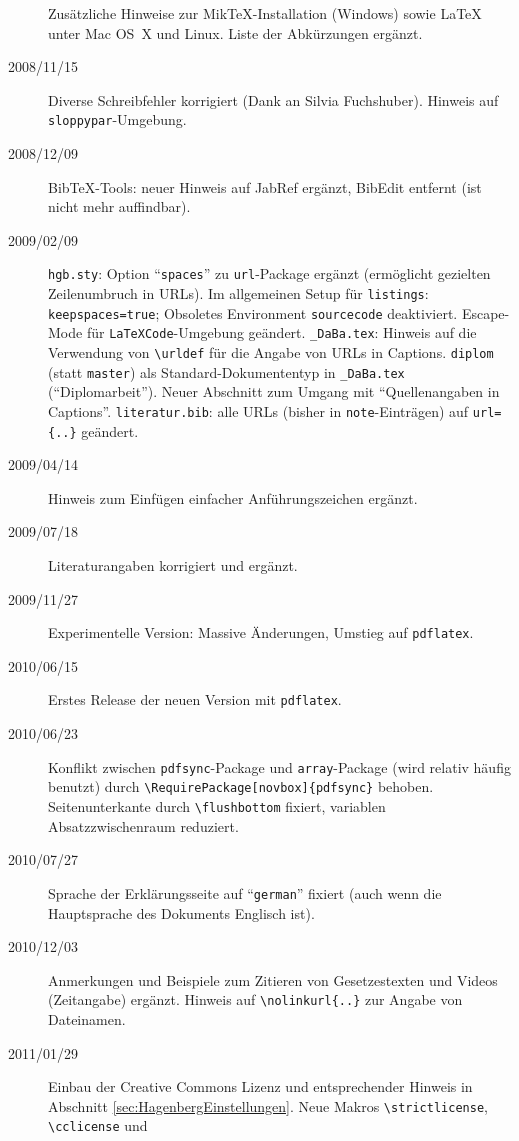 \begin{sloppypar}
\begin{description}
Zusätzliche Hinweise zur MikTeX-Installation (Windows) sowie LaTeX unter Mac OS~X und Linux.
Liste der Abkürzungen ergänzt.%
\item[2008/11/15] 
Diverse Schreibfehler korrigiert (Dank an Silvia Fuchshuber). Hinweis auf 
\texttt{sloppypar}-Umgebung.
%
\item[2008/12/09] 
BibTeX-Tools: neuer Hinweis auf JabRef ergänzt, BibEdit entfernt (ist nicht mehr auffindbar).
%
\item[2009/02/09]
\texttt{hgb.sty}: Option "`\texttt{spaces}"' zu \texttt{url}-Package ergänzt (ermöglicht gezielten Zeilenumbruch in URLs). 
Im allgemeinen Setup für \texttt{listings}: \texttt{keepspaces=true};
Obsoletes Environment \texttt{sourcecode} deaktiviert.
Escape-Mode für \texttt{LaTeXCode}-Umgebung geändert.
\verb!_DaBa.tex!: Hinweis auf die Verwendung von \verb!\urldef! für die Angabe von URLs in Captions. \texttt{diplom} (statt \texttt{master}) als Standard-Dokumententyp in \verb!_DaBa.tex! ("`Diplomarbeit"'). Neuer Abschnitt zum Umgang mit ``Quellenangaben in Captions''.
\texttt{literatur.bib}: alle URLs (bisher in \texttt{note}-Einträgen) auf \verb!url={..}! geändert.
%
\item[2009/04/14]
Hinweis zum Einfügen einfacher Anführungszeichen ergänzt.
%
\item[2009/07/18]
Literaturangaben korrigiert und ergänzt.
%
\item[2009/11/27]
Experimentelle Version: Massive Änderungen, Umstieg auf \texttt{pdflatex}.
%
\item[2010/06/15]
Erstes Release der neuen Version mit \texttt{pdflatex}.
\item[2010/06/23]
Konflikt zwischen \texttt{pdfsync}-Package und \texttt{array}-Package (wird relativ häufig benutzt) durch \verb!\RequirePackage[novbox]{pdfsync}! behoben.
Seitenunterkante durch \verb!\flushbottom! fixiert,
variablen Absatzzwischenraum reduziert.
\item[2010/07/27]
Sprache der Erklärungsseite auf "`\texttt{german}"' fixiert (auch wenn die Hauptsprache des Dokuments  Englisch ist). %
\item[2010/12/03]
Anmerkungen und Beispiele zum Zitieren von Gesetzestexten und Videos (Zeitangabe) ergänzt.
Hinweis auf \verb!\nolinkurl{..}! zur Angabe von Dateinamen.
\item[2011/01/29]
Einbau der Creative Commons Lizenz und entsprechender Hinweis in 
Abschnitt \ref{sec:HagenbergEinstellungen}. Neue Makros
\verb!\strictlicense!,
\verb!\cclicense! und

\end{description}
\end{sloppypar}
